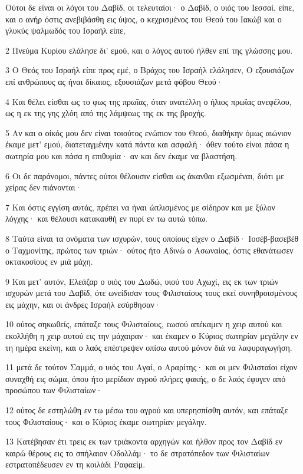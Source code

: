 \par Ούτοι δε είναι οι λόγοι του Δαβίδ, οι τελευταίοι· ο Δαβίδ, ο υιός του Ιεσσαί, είπε, και ο ανήρ όστις ανεβιβάσθη εις ύψος, ο κεχρισμένος του Θεού του Ιακώβ και ο γλυκύς ψαλμωδός του Ισραήλ είπε,
\par 2 Πνεύμα Κυρίου ελάλησε δι' εμού, και ο λόγος αυτού ήλθεν επί της γλώσσης μου.
\par 3 Ο Θεός του Ισραήλ είπε προς εμέ, ο Βράχος του Ισραήλ ελάλησεν, Ο εξουσιάζων επί ανθρώπους ας ήναι δίκαιος, εξουσιάζων μετά φόβου Θεού·
\par 4 Και θέλει είσθαι ως το φως της πρωΐας, όταν ανατέλλη ο ήλιος πρωΐας ανεφέλου, ως η εκ της γης χλόη από της λάμψεως της εκ της βροχής.
\par 5 Αν και ο οίκός μου δεν είναι τοιούτος ενώπιον του Θεού, διαθήκην όμως αιώνιον έκαμε μετ' εμού, διατεταγμένην κατά πάντα και ασφαλή· όθεν τούτο είναι πάσα η σωτηρία μου και πάσα η επιθυμία· αν και δεν έκαμε να βλαστήση.
\par 6 Οι δε παράνομοι, πάντες ούτοι θέλουσιν είσθαι ως άκανθαι εξωσμέναι, διότι με χείρας δεν πιάνονται·
\par 7 Και όστις εγγίση αυτάς, πρέπει να ήναι ώπλισμένος με σίδηρον και με ξύλον λόγχης· και θέλουσι κατακαυθή εν πυρί εν τω αυτώ τόπω.
\par 8 Ταύτα είναι τα ονόματα των ισχυρών, τους οποίους είχεν ο Δαβίδ· Ιοσέβ-βασεβέθ ο Ταχμονίτης, πρώτος των τριών· ούτος ήτο Αδινώ ο Ασωναίος, όστις εθανάτωσεν οκτακοσίους εν μιά μάχη.
\par 9 Και μετ' αυτόν, Ελεάζαρ ο υιός του Δωδώ, υιού του Αχωχί, εις εκ των τριών ισχυρών μετά του Δαβίδ, ότε ωνείδισαν τους Φιλισταίους τους εκεί συνηθροισμένους εις μάχην, και οι άνδρες Ισραήλ εσύρθησαν·
\par 10 ούτος σηκωθείς, επάταξε τους Φιλισταίους, εωσού απέκαμεν η χειρ αυτού και εκολλήθη η χειρ αυτού εις την μάχαιραν· και έκαμεν ο Κύριος σωτηρίαν μεγάλην εν τη ημέρα εκείνη, και ο λαός επέστρεψεν οπίσω αυτού μόνον διά να λαφυραγωγήση.
\par 11 μετά δε τούτον Σαμμά, ο υιός του Αγαί, ο Αραρίτης· και οι μεν Φιλισταίοι είχον συναχθή εις σώμα, όπου ήτο μερίδιον αγρού πλήρες φακής, ο δε λαός έφυγεν από προσώπου των Φιλισταίων·
\par 12 ούτος δε εστηλώθη εν τω μέσω του αγρού και υπερησπίσθη αυτόν, και επάταξε τους Φιλισταίους· και ο Κύριος έκαμε σωτηρίαν μεγάλην.
\par 13 Κατέβησαν έτι τρεις εκ των τριάκοντα αρχηγών και ήλθον προς τον Δαβίδ εν καιρώ θέρους εις το σπήλαιον Οδολλάμ· το δε στρατόπεδον των Φιλισταίων εστρατοπέδευσεν εν τη κοιλάδι Ραφαείμ.
